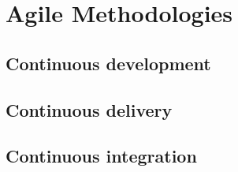 \section{Agile Methodologies}

\subsection{Continuous development}
\subsection{Continuous delivery}
\subsection{Continuous integration}

